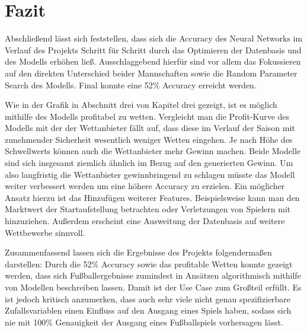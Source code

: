 \chapter{Fazit}

Abschließend lässt sich feststellen, dass sich die Accuracy des Neural Networks
im Verlauf des Projekts Schritt für Schritt durch das Optimieren der Datenbasis
und des Modells erhöhen ließ. Ausschlaggebend hierfür sind vor allem das Fokussieren
auf den direkten Unterschied beider Mannschaften sowie die Random Parameter Search
des Modells. Final konnte eine 52\% Accuracy erreicht werden.

Wie in der Grafik in Abschnitt drei von Kapitel drei gezeigt, ist es möglich mithilfe
des Modells profitabel zu wetten. Vergleicht man die Profit-Kurve des Modells
mit der der Wettanbieter fällt auf, dass diese im Verlauf der Saison mit zunehmender Sicherheit wesentlich weniger Wetten eingehen. 
Je nach Höhe des Schwellwerts können auch die Wettanbieter mehr Gewinn machen. Beide Modelle sind sich insgesamt ziemlich ähnlich im Bezug auf den generierten Gewinn.
Um also langfristig die Wettanbieter gewinnbringend zu schlagen müsste das Modell
weiter verbessert werden um eine höhere Accuracy zu erzielen. Ein möglicher Ansatz hierzu ist das Hinzufügen weiterer Features. Beispielsweise kann man den Marktwert der Startaufstellung betrachten oder Verletzungen von Spielern mit hinzuziehen. Außerdem erscheint eine Ausweitung der Datenbasis auf weitere Wettbewerbe sinnvoll.

Zusammenfassend lassen sich die Ergebnisse des Projekts folgendermaßen darstellen:
Durch die 52\% Accuracy sowie das profitable Wetten konnte gezeigt werden, dass sich Fußballergebnisse zumindest in
Ansätzen algorithmisch mithilfe von Modellen beschreiben lassen. Damit ist der Use
Case zum Großteil erfüllt. Es ist jedoch kritisch anzumerken, dass auch sehr viele
nicht genau spezifizierbare Zufallsvariablen einen Einfluss auf den Ausgang
eines Spiels haben, sodass sich nie mit 100\% Genauigkeit der Ausgang
eines Fußballspiels vorhersagen lässt.